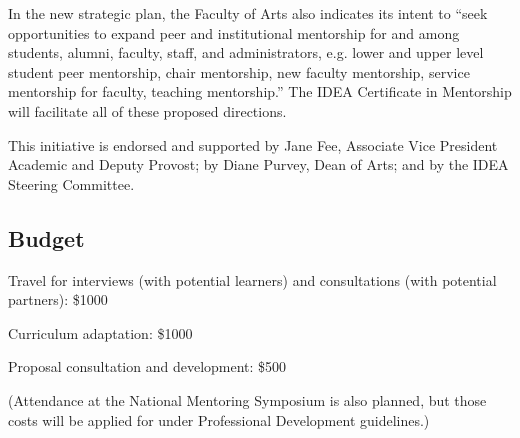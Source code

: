 \documentclass[]{article}
\begin{document}
In the new strategic plan, the Faculty of Arts also indicates its intent to ``seek opportunities to expand peer and institutional mentorship for and among
students, alumni, faculty, staff, and administrators, e.g. lower and upper level student peer mentorship, chair mentorship, new faculty mentorship, service mentorship for faculty, teaching mentorship.'' The IDEA Certificate in Mentorship will facilitate all of these proposed directions.

This initiative is endorsed and supported by Jane Fee, Associate Vice
President Academic and Deputy Provost; by Diane Purvey, Dean of Arts;
and by the IDEA Steering Committee.

\subsection{Budget}

Travel for interviews (with potential learners) and
consultations (with potential partners): \$1000

Curriculum adaptation: \$1000

Proposal consultation and development: \$500

(Attendance at the National Mentoring Symposium is also planned, but those costs will be applied for under Professional Development guidelines.)
\end{document}
